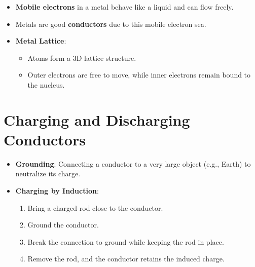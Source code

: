\documentclass{article}
\begin{document}
\begin{itemize}
    \item \textbf{Mobile electrons} in a metal behave like a liquid and can flow freely.
    \item Metals are good \textbf{conductors} due to this mobile electron sea.
    \item \textbf{Metal Lattice}:
    \begin{itemize}
        \item Atoms form a 3D lattice structure.
        \item Outer electrons are free to move, while inner electrons remain bound to the nucleus.
    \end{itemize}
\end{itemize}

\section*{Charging and Discharging Conductors}
\begin{itemize}
    \item \textbf{Grounding}: Connecting a conductor to a very large object (e.g., Earth) to neutralize its charge.
    \item \textbf{Charging by Induction}:
    \begin{enumerate}
        \item Bring a charged rod close to the conductor.
        \item Ground the conductor.
        \item Break the connection to ground while keeping the rod in place.
        \item Remove the rod, and the conductor retains the induced charge.
    \end{enumerate}
\end{itemize}
\end{document}
